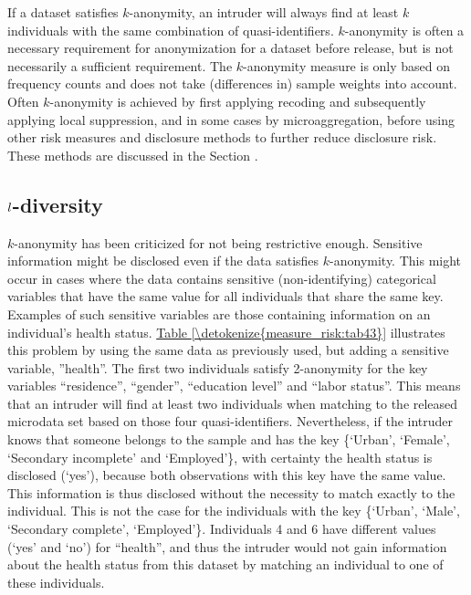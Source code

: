 \documentclass[letterpaper,10pt,english]{sphinxmanual}
\begin{document}
If a dataset satisfies \(k\)-anonymity, an intruder will always find
at least \(k\) individuals with the same combination of
quasi-identifiers. \(k\)-anonymity is often a necessary requirement
for anonymization for a dataset before release, but is not necessarily a
sufficient requirement. The \(k\)-anonymity measure is only based on
frequency counts and does not take (differences in) sample weights into
account. Often \(k\)-anonymity is achieved by first applying
recoding and subsequently applying local suppression, and in some cases
by microaggregation, before using other risk measures and disclosure
methods to further reduce disclosure risk. These methods are discussed
in the Section .


\subsection{\protect\(l\protect\)-diversity}
\label{\detokenize{measure_risk:diversity}}
\(k\)-anonymity has been criticized for not being restrictive
enough. Sensitive information might be disclosed even if the data
satisfies \(k\)-anonymity. This might occur in cases where the data
contains sensitive (non-identifying) categorical variables that have the
same value for all individuals that share the same key. Examples of such
sensitive variables are those containing information on an individual’s
health status. \hyperref[\detokenize{measure_risk:tab43}]{Table \ref{\detokenize{measure_risk:tab43}}} illustrates this problem by using the same data
as previously used, but adding a sensitive variable, ”health”. The first
two individuals satisfy 2-anonymity for the key variables “residence”,
“gender”, “education level” and “labor status”. This means that an
intruder will find at least two individuals when matching to the
released microdata set based on those four quasi-identifiers.
Nevertheless, if the intruder knows that someone belongs to the sample
and has the key \{‘Urban’, ‘Female’, ‘Secondary incomplete’ and
‘Employed’\}, with certainty the health status is disclosed (‘yes’),
because both observations with this key have the same value. This
information is thus disclosed without the necessity to match exactly to
the individual. This is not the case for the individuals with the key
\{‘Urban’, ‘Male’, ‘Secondary complete’, ‘Employed’\}. Individuals 4 and 6
have different values (‘yes’ and ‘no’) for “health”, and thus the
intruder would not gain information about the health status from this
dataset by matching an individual to one of these individuals.
\end{document}
